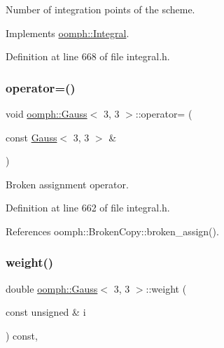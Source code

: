 Number of integration points of the scheme. 



Implements \hyperlink{classoomph_1_1Integral_a1a270de9d99a1fcf1d25a6c1017f65fa}{oomph\+::\+Integral}.



Definition at line 668 of file integral.\+h.

\mbox{\label{classoomph_1_1Gauss_3_013_00_013_01_4_a8122c07e87dbd2c8ed1ea48c8e701601}} 
\subsubsection{\texorpdfstring{operator=()}{operator=()}}
{\footnotesize\ttfamily void \hyperlink{classoomph_1_1Gauss}{oomph\+::\+Gauss}$<$ 3, 3 $>$\+::operator= (\begin{DoxyParamCaption}\item[{const \hyperlink{classoomph_1_1Gauss}{Gauss}$<$ 3, 3 $>$ \&}]{ }\end{DoxyParamCaption})\hspace{0.3cm}{\ttfamily [inline]}}



Broken assignment operator. 



Definition at line 662 of file integral.\+h.



References oomph\+::\+Broken\+Copy\+::broken\+\_\+assign().

\mbox{\label{classoomph_1_1Gauss_3_013_00_013_01_4_a485d1426df5386aa09e95838b0763482}} 
\subsubsection{\texorpdfstring{weight()}{weight()}}
{\footnotesize\ttfamily double \hyperlink{classoomph_1_1Gauss}{oomph\+::\+Gauss}$<$ 3, 3 $>$\+::weight (\begin{DoxyParamCaption}\item[{const unsigned \&}]{i }\end{DoxyParamCaption}) const\hspace{0.3cm}{\ttfamily [inline]}, {\ttfamily [virtual]}}



